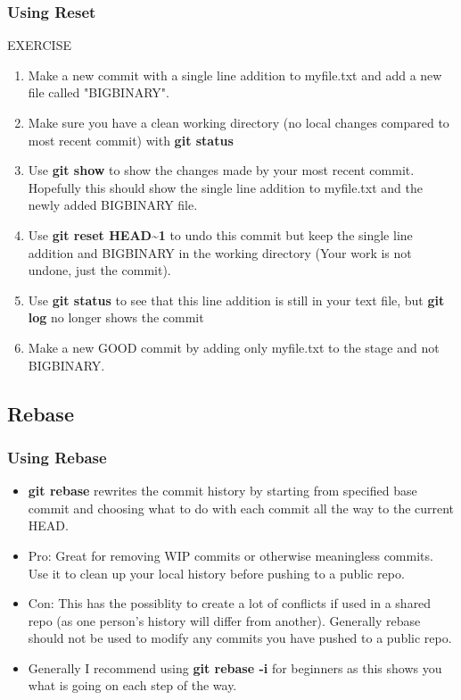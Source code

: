 \documentclass{beamer}
\begin{document}
\begin{frame}[fragile]
	\frametitle{Using Reset}
	\begin{block}{EXERCISE}
		\begin{enumerate}
			\item Make a new commit with a single line addition to myfile.txt and add a new file called "BIGBINARY". 
			\item Make sure you have a clean working directory (no local changes compared to most recent commit) with \textbf{git status}
			\item Use \textbf{git show} to show the changes made by your most recent commit. Hopefully this should show the single line addition to myfile.txt and the newly added BIGBINARY file.
			\item Use \textbf{git reset HEAD\textasciitilde1} to undo this commit but keep the single line addition and BIGBINARY in the working directory (Your work is not undone, just the commit).
			\item Use \textbf{git status} to see that this line addition is still in your text file, but \textbf{git log} no longer shows the commit
			\item Make a new GOOD commit by adding only myfile.txt to the stage and not BIGBINARY.
		\end{enumerate}
	\end{block}
\end{frame}

\subsection{Rebase}

\begin{frame}[fragile]
	\frametitle{Using Rebase}
	\begin{itemize}
		\item \textbf{git rebase} rewrites the commit history by starting from specified base commit and choosing what to do with each commit all the way to the current HEAD.
		\item Pro: Great for removing WIP commits or otherwise meaningless commits. Use it to clean up your local history before pushing to a public repo.
		\item Con: This has the possiblity to create a lot of conflicts if used in a shared repo (as one person's history will differ from another). Generally rebase should not be used to modify any commits you have pushed to a public repo. 
		\item Generally I recommend using \textbf{git rebase -i} for beginners as this shows you what is going on each step of the way.
	\end{itemize}
\end{frame}
\end{document}
